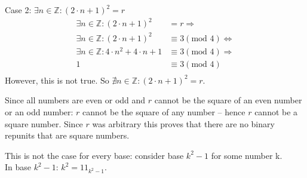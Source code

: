 \documentclass[10pt,\jkfside,a4paper]{article}
\begin{document}
\begin{enumerate}
\begin{enumerate}
\begin{center}
Case 2: $\exists n \in \mathbb{Z}: (2\cdot n + 1)^2 = r$
\begin{equation}
\begin{split}
\exists n \in \mathbb{Z}: (2\cdot n + 1)^2 &= r\Longrightarrow\\
\exists n \in \mathbb{Z}: (2\cdot n + 1)^2 &\equiv 3(\text{mod } 4)\Longleftrightarrow\\
\exists n \in \mathbb{Z}: 4\cdot n^2 + 4\cdot n + 1 &\equiv 3(\text{mod } 4)\Longrightarrow\\
1 &\equiv 3(\text{mod } 4)\\
\end{split}
\end{equation}
However, this is not true. So $\nexists n \in \mathbb{Z}: (2\cdot n + 1)^2 = r$.
\end{center}
Since all numbers are even or odd and $r$ cannot be the square of an even number or an odd number: 
$r$ cannot be the square of any number -- hence $r$ cannot be a square number. 
Since $r$ was arbitrary this proves that there are no binary repunits that are square numbers.

This is not the case for every base: consider base $k^2 - 1$ for some number k.\\
In base $k^2 - 1$: $k^2 = 11_{k^2 - 1}$.

\end{enumerate}

\end{enumerate}
\end{document}
